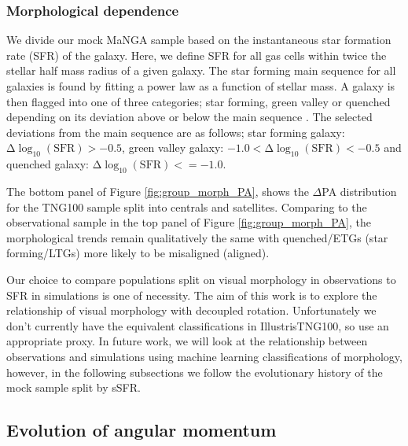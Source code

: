 \subsubsection{Morphological dependence} \label{sec:tng_morph}
We divide our mock MaNGA sample based on the instantaneous star formation rate (SFR) of the galaxy. Here, we define SFR for all gas cells within twice the stellar half mass radius of a given galaxy. The star forming main sequence for all galaxies is found by fitting a power law as a function of stellar mass. A galaxy is then flagged into one of three categories; star forming, green valley or quenched depending on its deviation above or below the main sequence \citep{pillepich2019}. The selected deviations from the main sequence are as follows; star forming galaxy: $\mathrm{\Delta \log_{10}(SFR) > −0.5}$, green valley galaxy: $\mathrm{-1.0 < \Delta \log_{10}(SFR) < -0.5}$ and quenched galaxy: $\mathrm{\Delta \log_{10}(SFR) <= -1.0}$.

The bottom panel of Figure \ref{fig:group_morph_PA}, shows the $\Delta$PA distribution for the TNG100 sample split into centrals and satellites. Comparing to the observational sample in the top panel of Figure \ref{fig:group_morph_PA}, the morphological trends remain qualitatively the same with quenched/ETGs (star forming/LTGs) more likely to be misaligned (aligned).

Our choice to compare populations split on visual morphology in observations to SFR in simulations is one of necessity. The aim of this work is to explore the relationship of visual morphology with decoupled rotation. Unfortunately we don't currently have the equivalent classifications in IllustrisTNG100, so use an appropriate proxy. In future work, we will look at the relationship between observations and simulations using machine learning classifications of morphology, however, in the following subsections we follow the evolutionary history of the mock sample split by sSFR.

\subsection{Evolution of angular momentum} \label{sec:tng_ang_mom_evo}

